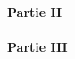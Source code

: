 \documentclass[12pt]{report}
\begin{document}
		\paragraph{Partie II}
		\paragraph{Partie III}
		\paragraph{}
%


\end{document}
